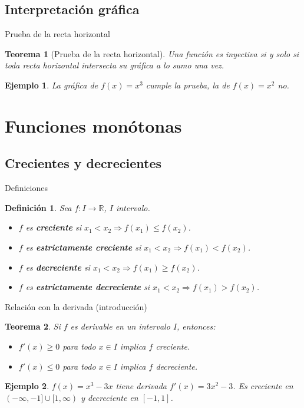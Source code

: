 \documentclass[10pt, spanish]{beamer}
\newtheorem{definicion}{Definición}
\newtheorem{teorema}{Teorema}
\newtheorem{ejemplo}{Ejemplo}
\begin{document}
	\subsection{Interpretación gráfica}
	\begin{frame}{Prueba de la recta horizontal}
		\begin{teorema}[Prueba de la recta horizontal]
			Una función es inyectiva si y solo si toda recta horizontal intersecta su gráfica a lo sumo una vez.
		\end{teorema}
		\begin{ejemplo}
			La gráfica de $f(x)=x^3$ cumple la prueba, la de $f(x)=x^2$ no.
		\end{ejemplo}
	\end{frame}
	
	\section{Funciones monótonas}
	\subsection{Crecientes y decrecientes}
	\begin{frame}{Definiciones}
		\begin{definicion}
			Sea $f:I\to\mathbb{R}$, $I$ intervalo.
			\begin{itemize}
				\item $f$ es \textbf{creciente} si $x_1<x_2 \Rightarrow f(x_1)\le f(x_2)$.
				\item $f$ es \textbf{estrictamente creciente} si $x_1<x_2 \Rightarrow f(x_1)<f(x_2)$.
				\item $f$ es \textbf{decreciente} si $x_1<x_2 \Rightarrow f(x_1)\ge f(x_2)$.
				\item $f$ es \textbf{estrictamente decreciente} si $x_1<x_2 \Rightarrow f(x_1)>f(x_2)$.
			\end{itemize}
		\end{definicion}
	\end{frame}
	
	\begin{frame}{Relación con la derivada (introducción)}
		\begin{teorema}
			Si $f$ es derivable en un intervalo $I$, entonces:
			\begin{itemize}
				\item $f'(x)\ge 0$ para todo $x\in I$ implica $f$ creciente.
				\item $f'(x)\le 0$ para todo $x\in I$ implica $f$ decreciente.
			\end{itemize}
		\end{teorema}
		\begin{ejemplo}
			$f(x)=x^3-3x$ tiene derivada $f'(x)=3x^2-3$. Es creciente en $(-\infty,-1]\cup[1,\infty)$ y decreciente en $[-1,1]$.
		\end{ejemplo}
	\end{frame}
	
\end{document}
